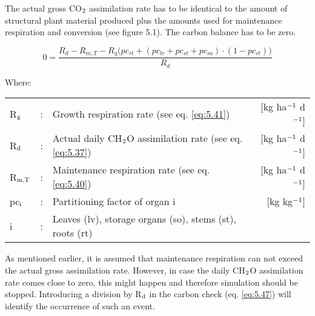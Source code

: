 The actual gross CO$_{{\rm 2}}$ assimilation rate has to be identical to the amount of structural plant
material produced plus the amounts used for maintenance respiration and conversion (see
figure 5.1). The carbon balance has to be zero. 

\begin{equation}
\label{eq:5.47}
0 = {\frac{R_{d} - R_{m,T} - R_{g} \big( pc_{rt} + (pc_{lv} + pc_{st} + pc_{so}) \cdot (1 - pc_{rt}) \big) }{R_d}}  
\end{equation}

Where:\\[5pt]
\begin{tabularx}{\textwidth}{llXr}
	R$_{{\rm g}}$ &:& Growth respiration rate (see eq. \ref{eq:5.41})   &
	[kg ha$^{{\rm -1}}$ d$^{{\rm -1}}$]\\
	R$_{{\rm d}}$ &:& Actual daily CH$_{{\rm 2}}$O assimilation rate (see eq. \ref{eq:5.37})   &
	[kg ha$^{{\rm -1}}$ d$^{{\rm -1}}$]\\
	R$_{{\rm m,T}}$ &:& Maintenance respiration rate (see eq. \ref{eq:5.40})   &
	[kg ha$^{{\rm -1}}$ d$^{{\rm -1}}$]\\
	pc$_{{\rm i}}$ &:& Partitioning factor of organ i    &
	[kg kg$^{{\rm -1}}$]\\
	i &:& Leaves (lv), storage organs (so), stems (st), roots (rt)\\
\end{tabularx}

As mentioned earlier, it is assumed that maintenance respiration can not exceed the actual
gross assimilation rate. However, in case the daily CH$_{{\rm 2}}$O assimilation rate comes close to
zero, this might happen and therefore simulation should be stopped. Introducing a
division by R$_{{\rm d}}$ in the carbon check (eq. \ref{eq:5.47}) will identify the occurrence of such an
event.

